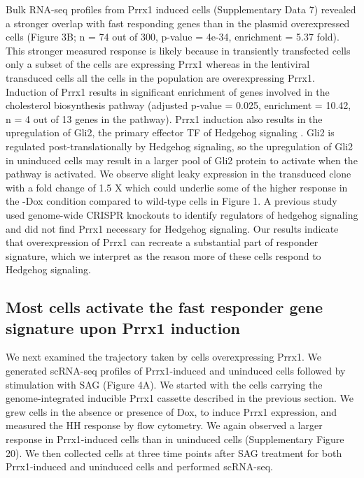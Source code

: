 Bulk RNA-seq profiles from Prrx1 induced cells (Supplementary Data 7) revealed a stronger overlap with fast responding genes than in the plasmid overexpressed cells (Figure 3B; n = 74 out of 300, p-value = 4e-34, enrichment = 5.37 fold). This stronger measured response is likely because in transiently transfected cells only a subset of the cells are expressing Prrx1 whereas in the lentiviral transduced cells all the cells in the population are overexpressing Prrx1. Induction of Prrx1 results in significant enrichment of genes involved in the cholesterol biosynthesis pathway (adjusted p-value = 0.025, enrichment = 10.42, n = 4 out of 13 genes in the pathway). Prrx1 induction also results in the upregulation of Gli2, the primary effector TF of Hedgehog signaling \cite{Kong2019-wo,Briscoe2013-ze,Lee2016-bf}. Gli2 is regulated post-translationally by Hedgehog signaling, so the upregulation of Gli2 in uninduced cells may result in a larger pool of Gli2 protein to activate when the pathway is activated. We observe slight leaky expression in the transduced clone with a fold change of 1.5 X which could underlie some of the higher response in the -Dox condition compared to wild-type cells in Figure 1. A previous study used genome-wide CRISPR knockouts \cite{Pusapati2018-gs} to identify regulators of hedgehog signaling and did not find Prrx1 necessary for Hedgehog signaling. Our results indicate that overexpression of Prrx1 can recreate a substantial part of responder signature, which we interpret as the reason more of these cells respond to Hedgehog signaling.

\subsection{Most cells activate the fast responder gene signature upon Prrx1 induction}

We next examined the trajectory taken by cells overexpressing Prrx1. We generated scRNA-seq profiles of Prrx1-induced and uninduced cells followed by stimulation with SAG (Figure 4A). We started with the cells carrying the genome-integrated inducible Prrx1 cassette described in the previous section. We grew cells in the absence or presence of Dox, to induce Prrx1 expression, and measured the HH response by flow cytometry. We again observed a larger response in Prrx1-induced cells than in uninduced cells (Supplementary Figure 20). We then collected cells at three time points after SAG treatment for both Prrx1-induced and uninduced cells and performed scRNA-seq.

